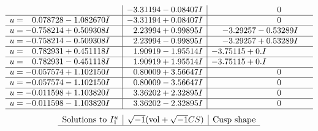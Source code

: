 \documentclass[1p]{elsarticle_modified}
\theoremstyle{definition}
\newcommand{\I}{\sqrt{-1}}
\begin{document}
$$\begin{array}{c|c|c}
 & -3.31194 - 0.08407 I & \phantom{-0.000000 } 0 \\ \hline\begin{aligned}
u &= \phantom{-}0.078728 - 1.082670 I\end{aligned}
 & -3.31194 + 0.08407 I & \phantom{-0.000000 } 0 \\ \hline\begin{aligned}
u &= -0.758214 + 0.509308 I\end{aligned}
 & \phantom{-}2.23994 + 0.99895 I & -3.29257 - 0.53289 I \\ \hline\begin{aligned}
u &= -0.758214 - 0.509308 I\end{aligned}
 & \phantom{-}2.23994 - 0.99895 I & -3.29257 + 0.53289 I \\ \hline\begin{aligned}
u &= \phantom{-}0.782931 + 0.451118 I\end{aligned}
 & \phantom{-}1.90919 - 1.95514 I & -3.75115 + 0. I\phantom{ +0.000000I} \\ \hline\begin{aligned}
u &= \phantom{-}0.782931 - 0.451118 I\end{aligned}
 & \phantom{-}1.90919 + 1.95514 I & -3.75115 + 0. I\phantom{ +0.000000I} \\ \hline\begin{aligned}
u &= -0.057574 + 1.102150 I\end{aligned}
 & \phantom{-}0.80009 + 3.56647 I & \phantom{-0.000000 } 0 \\ \hline\begin{aligned}
u &= -0.057574 - 1.102150 I\end{aligned}
 & \phantom{-}0.80009 - 3.56647 I & \phantom{-0.000000 } 0 \\ \hline\begin{aligned}
u &= -0.011598 + 1.103820 I\end{aligned}
 & \phantom{-}3.36202 + 2.32895 I & \phantom{-0.000000 } 0 \\ \hline\begin{aligned}
u &= -0.011598 - 1.103820 I\end{aligned}
 & \phantom{-}3.36202 - 2.32895 I & \phantom{-0.000000 } 0\\
 \hline 
 \end{array}$$\newpage$$\begin{array}{c|c|c}  
\text{Solutions to }I^u_{1}& \I (\text{vol} + \sqrt{-1}CS) & \text{Cusp shape}\\
 \hline 

\end{array}$$
\end{document}
